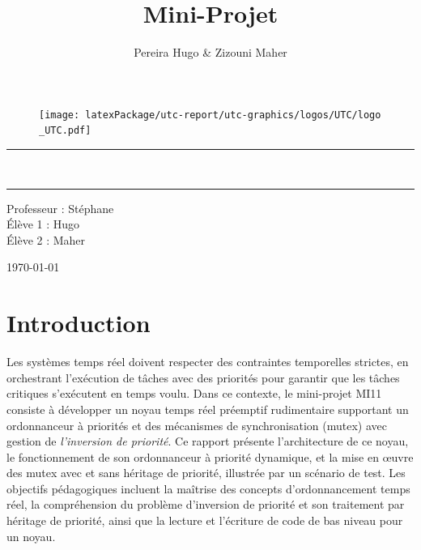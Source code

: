 \documentclass{latexPackage/utc-report/utc-report}
\title{Mini-Projet}
\author{{\sc Pereira} Hugo & {\sc Zizouni} Maher}
\begin{document}
\thispagestyle{empty}
\setcounter{page}{0}

\begin{figure}[H]
    \centering
    \texttt{[image: latexPackage/utc-report/utc-graphics/logos/UTC/logo\\\_UTC.pdf]}
\end{figure}

\vspace{2cm}

\begin{center}
{\color{jauneUTC}\rule{\linewidth}{0.8mm}}
\vspace*{0mm}
\Huge{\textbf{\theUV \\ \thetitle}}
{\color{jauneUTC}\rule{\linewidth}{0.8mm}}

\vspace{2cm}

\Large{
    Professeur :  Stéphane \\
    Élève 1 :  Hugo \\
    Élève 2 :  Maher
} \\

\vspace{2cm}

\vspace{2cm}

\today
\end{center}

\pagebreak

\section{Introduction}


Les systèmes temps réel doivent respecter des contraintes temporelles strictes, en orchestrant l’exécution de tâches avec des priorités pour garantir que les tâches critiques s’exécutent en temps voulu. Dans ce contexte, le mini-projet MI11 consiste à développer un noyau temps réel préemptif rudimentaire supportant un ordonnanceur à priorités et des mécanismes de synchronisation (mutex) avec gestion de \textit{l’inversion de priorité}. Ce rapport présente l’architecture de ce noyau, le fonctionnement de son ordonnanceur à priorité dynamique, et la mise en œuvre des mutex avec et sans héritage de priorité, illustrée par un scénario de test. Les objectifs pédagogiques incluent la maîtrise des concepts d’ordonnancement temps réel, la compréhension du problème d’inversion de priorité et son traitement par héritage de priorité, ainsi que la lecture et l’écriture de code de bas niveau pour un noyau.
\end{document}
